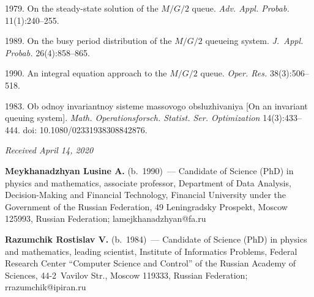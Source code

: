 \begin{multicols}{2}
{{\begin{thebibliography}{9}
 1979. On the steady-state solution of the $M/G/2$ queue. 
\textit{Adv. Appl. Probab.} 11(1):240--255.

 1989. On the busy period distribution of the $M/G/2$ 
queueing system.
\textit{J.~Appl. Probab.} 26(4):858--865.

 1990. An 
integral equation approach
to the $M/G/2$ queue. \textit{Oper. Res.} 38(3):506--518.

 1983. Ob odnoy invariantnoy 
sisteme
massovogo obsluzhivaniya [On an invariant queuing system]. \textit{Math. 
Operationsforsch. Statist. Ser. Optimization}
14(3):433--444. doi: 10.1080/02331938308842876.

\end{thebibliography}

 }
 }

\end{multicols}

\vspace*{-12pt}

\hfill{\small\textit{Received April 14, 2020}}


\vspace*{-24pt}

\Contr

\vspace*{-4pt}

\noindent
\textbf{Meykhanadzhyan Lusine A.} (b.\ 1990)~---
Candidate of Science (PhD) in physics and
mathematics, associate professor,
Department of Data Analysis, Decision-Making and Financial Technology,
Financial University under the Government of the Russian Federation,
49 Leningradsky Prospekt, Moscow 125993, Russian Federation;
\mbox{lamejkhanadzhyan@fa.ru}


\noindent
\textbf{Razumchik Rostislav V.} (b.\ 1984)~---
Candidate of Science (PhD) in physics and mathematics, leading scientist,
Institute of Informatics Problems, Federal Research Center ``Computer 
Science and Control'' of the Russian Academy of Sciences, 44-2~Vavilov 
Str., Moscow 119333, Russian Federation; rrazumchik@ipiran.ru


\label{end\stat}

\renewcommand{\bibname}{\protect\rm Литература} 